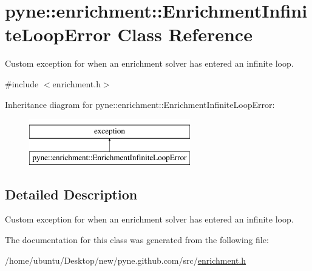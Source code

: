 \hypertarget{classpyne_1_1enrichment_1_1_enrichment_infinite_loop_error}{}\section{pyne\+:\+:enrichment\+:\+:Enrichment\+Infinite\+Loop\+Error Class Reference}
\label{classpyne_1_1enrichment_1_1_enrichment_infinite_loop_error}


Custom exception for when an enrichment solver has entered an infinite loop.  




{\ttfamily \#include $<$enrichment.\+h$>$}

Inheritance diagram for pyne\+:\+:enrichment\+:\+:Enrichment\+Infinite\+Loop\+Error\+:\begin{figure}[H]
\begin{center}
\leavevmode
\includegraphics[height=2.000000cm]{classpyne_1_1enrichment_1_1_enrichment_infinite_loop_error}
\end{center}
\end{figure}


\subsection{Detailed Description}
Custom exception for when an enrichment solver has entered an infinite loop. 

The documentation for this class was generated from the following file\+:\begin{DoxyCompactItemize}
\item 
/home/ubuntu/\+Desktop/new/pyne.\+github.\+com/src/\hyperlink{enrichment_8h}{enrichment.\+h}\end{DoxyCompactItemize}
